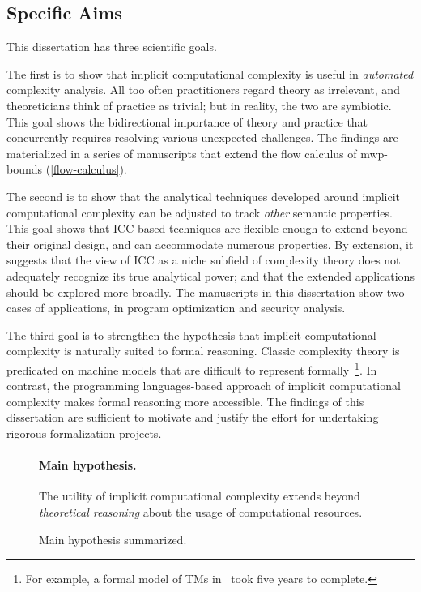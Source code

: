 \subsection{Specific Aims}\label{subsec:specific-aims}

This dissertation has three scientific goals.

The first is to show that implicit computational complexity is useful in \emph{automated} complexity analysis.
All too often practitioners regard theory as irrelevant, and theoreticians think of practice as trivial;
but in reality, the two are symbiotic.
This goal shows the bidirectional importance of theory and practice that concurrently requires resolving various unexpected challenges. 
The findings are materialized in a series of manuscripts that extend the flow calculus of mwp-bounds (\autoref{flow-calculus}).

The second is to show that the analytical techniques developed around implicit computational complexity can be adjusted to track \emph{other} semantic properties.
This goal shows that ICC-based techniques are flexible enough to extend beyond their original design, and can accommodate numerous properties.
By extension, it suggests that the view of ICC as a niche subfield of complexity theory does not adequately recognize its true analytical power;
and that the extended applications should be explored more broadly.
The manuscripts in this dissertation show two cases of applications, in program optimization and security analysis.
 
The third goal is to strengthen the hypothesis that implicit computational complexity is naturally suited to formal reasoning.
Classic complexity theory is predicated on machine models that are difficult to represent formally~\footnote{
For example, a formal model of TMs in~\textcite{forster2020} took five years to complete.}.
In contrast, the programming languages-based approach of implicit computational complexity makes formal reasoning more accessible.
The findings of this dissertation are sufficient to motivate and justify the effort for undertaking rigorous formalization projects.

\begin{figure}[t]
\begin{mdframed}
\paragraph*{Main hypothesis.}
The utility of implicit computational complexity extends beyond \emph{theoretical reasoning} about the usage of computational resources.
\end{mdframed}
\caption[Main hypothesis summarized]
{Main hypothesis summarized.}
\label{fig:hypothesis}
\end{figure}

